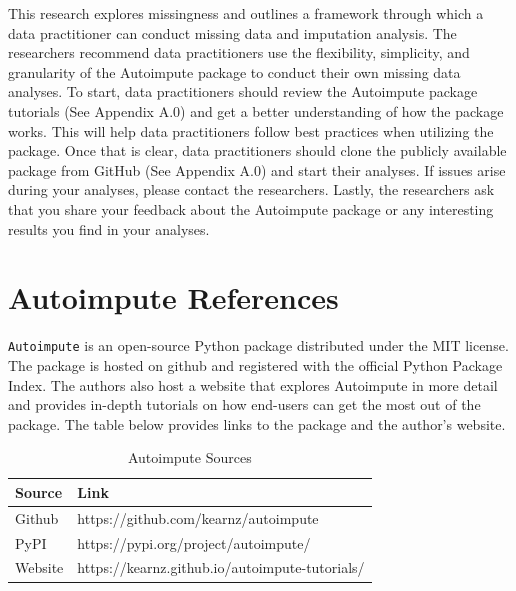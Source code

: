\documentclass[12pt,oneside]{chicagocapstone}
\begin{document}
This research explores missingness and outlines a framework through
which a data practitioner can conduct missing data and imputation
analysis. The researchers recommend data practitioners use the
flexibility, simplicity, and granularity of the Autoimpute package to
conduct their own missing data analyses. To start, data practitioners
should review the Autoimpute package tutorials (See Appendix A.0) and
get a better understanding of how the package works. This will help data
practitioners follow best practices when utilizing the package. Once
that is clear, data practitioners should clone the publicly available
package from GitHub (See Appendix A.0) and start their analyses. If
issues arise during your analyses, please contact the researchers.
Lastly, the researchers ask that you share your feedback about the
Autoimpute package or any interesting results you find in your analyses.

\appendix

\chapter{Autoimpute References}\label{autoimpute-references}

\texttt{Autoimpute} is an open-source Python package distributed under
the MIT license. The package is hosted on github and registered with the
official Python Package Index. The authors also host a website that
explores Autoimpute in more detail and provides in-depth tutorials on
how end-users can get the most out of the package. The table below
provides links to the package and the author's website.
\begin{table}[!h]

\caption{\label{tab:appendixa}Autoimpute Sources}
\begin{tabu} to 
\toprule
\begingroup\fontsize{13}{15}\selectfont \textbf{Source}\endgroup & \begingroup\fontsize{13}{15}\selectfont \textbf{Link}\endgroup\\
\midrule
Github & https://github.com/kearnz/autoimpute\\
PyPI & https://pypi.org/project/autoimpute/\\
Website & https://kearnz.github.io/autoimpute-tutorials/\\
\bottomrule
\end{tabu}
\end{table}
\end{document}
